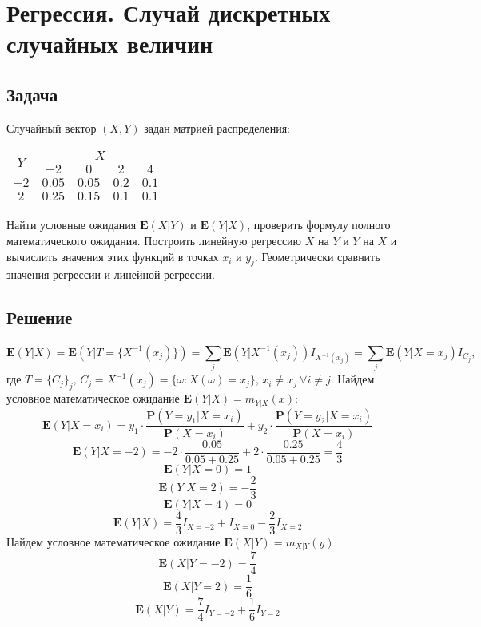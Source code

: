 \documentclass[fleqn, 10pt]{article}
\begin{document}
\section{Регрессия. Случай дискретных случайных величин}
\subsection{Задача}
Случайный вектор \((X,Y)\) задан матрией распределения:
\begin{center}
\begin{tabular}{
    | c | c | c | c | c | }
  \hline
  \multirow{2}{1em}{\(Y\)} & \multicolumn{4}{|c|}{\(X\)} \\
  \cline{2-5}
  & \(-2\) & \(0\) & \(2\) & \(4\) \\
  \hline
  \(-2\) & \(0.05\) & \(0.05\) & \(0.2\) & \(0.1\) \\
  \hline
  \(2\) & \(0.25\) & \(0.15\) & \(0.1\) & \(0.1\) \\
  \hline
\end{tabular}
\end{center}
Найти условные ожидания \(\textbf{E}(X|Y)\) и \(\textbf{E}(Y|X)\), проверить формулу полного математического ожидания. Построить линейную регрессию \(X\) на \(Y\) и \(Y\) на \(X\) и вычислить значения этих функций в точках \(x_i\) и \(y_j\). Геометрически сравнить значения регрессии и линейной регрессии.
\subsection{Решение}
\[\textbf{E}(Y|X) = \textbf{E}(Y|T=\{X^{-1}(x_j)\}) = \sum\limits_j^{}\textbf{E}(Y|X^{-1}(x_j))I_{X^{-1}(x_j)} = \sum\limits_j^{}\textbf{E}(Y|X=x_j)I_{C_j}\text{,}\]
где \(T = \{C_j\}_j \text{, } C_j = X^{-1}(x_j) = \{\omega : X(\omega) = x_j\} \text{, } x_i \ne x_j \ \forall i \ne j\).
Найдем условное математическое ожидание \(\textbf{E}(Y|X) = m_{Y|X}(x)\):
\[\textbf{E}(Y|X=x_i) = y_1\cdot\frac{\textbf{P}(Y=y_1|X=x_i)}{\textbf{P}(X=x_i)} + y_2 \cdot\frac{\textbf{P}(Y=y_2|X=x_i)}{\textbf{P}(X=x_i)}\]
\[\textbf{E}(Y|X=-2) = -2\cdot\frac{0.05}{0.05+0.25} + 2\cdot\frac{0.25}{0.05+0.25} = \frac{4}{3}\]
\[\textbf{E}(Y|X=0) = 1\]
\[\textbf{E}(Y|X=2) = -\frac{2}{3}\]
\[\textbf{E}(Y|X=4) = 0\]
\[\textbf{E}(Y|X) = \frac{4}{3}I_{X=-2}+I_{X=0}-\frac{2}{3}I_{X=2}\]
Найдем условное математическое ожидание \(\textbf{E}(X|Y)=m_{X|Y}(y)\):
\[\textbf{E}(X|Y=-2) = \frac{7}{4}\]
\[\textbf{E}(X|Y=2) = \frac{1}{6}\]
\[\textbf{E}(X|Y) = \frac{7}{4}I_{Y=-2}+\frac{1}{6}I_{Y=2}\]
\end{document}
